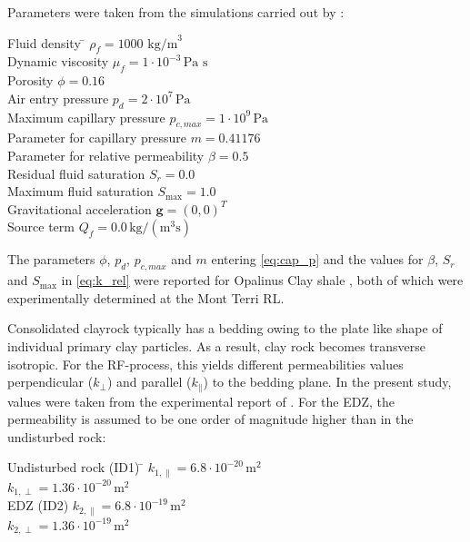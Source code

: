 Parameters were taken from the simulations carried out by \cite{ziefle2018}:
\begin{tabbing} 
Fluid density 		\hspace{4cm} \= $\rho_f=1000 \text{ kg/m}^3$	\\
Dynamic viscosity 	\>				$\mu_f= 1\cdot 10^{-3} \,  \text{Pa s}$\\
Porosity 			\> 				$\phi=0.16$ 					\\
Air entry pressure	\>				$p_d = 2 \cdot 10^{7} \, \text{Pa}$\\
Maximum capillary pressure \> 		$p_{c,max} = 1 \cdot 10^9 \, \text{Pa}$\\
Parameter for capillary pressure   \>	$m = 0.41176$\\
Parameter for relative permeability\> 	$\beta = 0.5$ \\
Residual fluid saturation \>			$S_r = 0.0$ \\
Maximum fluid saturation \> 			$S_\text{max}=1.0$ \\
Gravitational acceleration \>       $\textbf{g}=(0,0)^T$\\
Source term \>                      $Q_f = 0.0 \, \text{kg} / (\text{m}^3 \text{s})$
\end{tabbing}

The parameters $\phi$, $p_d$, $p_{c,max}$ and $m$ entering \eqref{eq:cap_p} and the values for $\beta$, $S_r$ and $S_\text{max}$ in \eqref{eq:k_rel} were reported for Opalinus Clay shale \cite{xu2013,wild2015}, both of which were experimentally determined at the Mont Terri RL.

Consolidated clayrock typically has a bedding owing to the plate like shape of individual primary clay particles. As a result,  clay rock becomes transverse isotropic. For the RF-process, this yields different permeabilities values perpendicular ($k_\perp$) and parallel ($k_\parallel$) to the bedding plane. In the present study, values were taken from the experimental report of \cite{bock2009}. For the EDZ, the permeability is assumed to be one order of magnitude higher than in the undisturbed rock: 
\begin{tabbing} 
Undisturbed rock (ID1)\hspace{3cm} \= $k_{1,\parallel}=6.8\cdot 10^{-20} \,  \text{m}^2$\\
 								   \> $k_{1,\perp}=1.36 \cdot 10^{-20} \, \text{m}^2$\\
EDZ (ID2)						   \> $k_{2,\parallel}=6.8 \cdot 10^{-19}\, \text{m}^2$\\
          						   \> $k_{2,\perp}=1.36 \cdot 10^{-19}\, \text{m}^2$\\
\end{tabbing}

